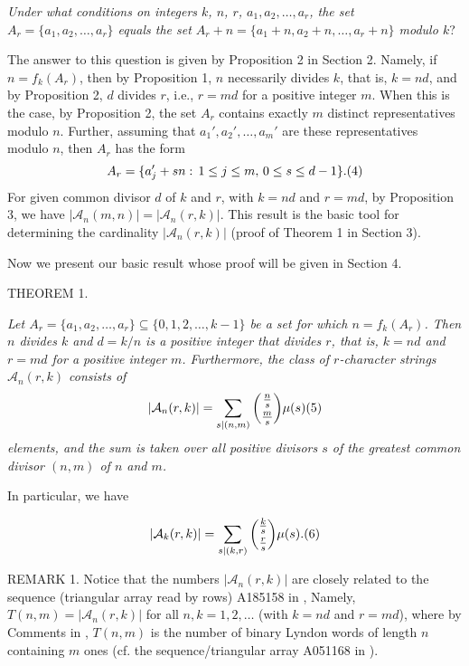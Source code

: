 \documentclass[12pt]{amsart}
\begin{document}
{ 
{\it Under what conditions on 
integers $k$, $n$, $r$,  $a_1,a_2,\ldots,a_r$, the  
set $A_r=\{a_1,a_2,\ldots,a_r\}$ equals the set 
$A_r+n=\{a_1+n,a_2+n,\ldots,a_r+n\}$ modulo $k$}?


 
The answer to this question is given by Proposition 2 in  Section 2.
Namely, if $n=f_k(A_r)$, then by Proposition 1,  $n$ necessarily  divides
$k$,  that is, $k=nd$, and by Proposition 2, $d$ divides $r$, i.e., 
$r=md$ for a positive 
integer $m$. When this is the case, by Proposition 2, the set $A_r$ 
  contains exactly $m$ distinct representatives modulo
$n$. Further,  assuming that $a_1',a_2',\ldots,a_m'$ are 
these  representatives modulo $n$, then $A_r$ has the form 
 $$
A_r=\{a_j'+sn :\, 1\le j\le m,\, 0\le s\le d-1\}.\relax(4)
 $$
\indent For given common divisor $d$ of $k$ and $r$, with $k=nd$ and $r=md$,
by Proposition 3, we have  $|{\mathcal A}_n(m,n)|=|{\mathcal A}_n(r,k)|$.
This result is the basic tool for determining the cardinality
$|{\mathcal A}_n(r,k)|$
(proof of Theorem 1 in Section 3). 
  

Now we present our basic  result whose proof will be given in Section 4.


\vspace{2mm}

T{\scriptsize HEOREM} 1.
 {\it Let $A_r=\{a_1,a_2,\ldots,a_r\}\subseteq 
\{0,1,2,\ldots,k-1\}$ be a set for which $n=f_k(A_r)$.
Then $n$ divides $k$ and $d=k/n$ is a positive integer that
 divides $r$, that is, $k=nd$ and 
$r=md$ for a positive integer $m$. Furthermore, the class of 
$r$-character strings ${\mathcal A}_n(r,k)$ consists of  
    $$
|{\mathcal A}_n(r,k)|=\sum_{s|(n,m)}{\frac{n}{s}\choose\frac{m}{s}}\mu(s)
\relax(5)
 $$
elements, and the sum is taken over all positive divisors $s$ of the greatest common divisor $(n,m)$ 
of $n$ and $m$.

In particular, we have}
$$
|{\mathcal A}_k(r,k)|=\sum_{s|(k,r)}{\frac{k}{s}\choose\frac{r}{s}}\mu(s).
\relax(6)
 $$
\vspace{2mm}

R{\scriptsize EMARK} 1. Notice that the numbers 
$|{\mathcal A}_n(r,k)|$ are closely related to the sequence 
(triangular array read by rows) A185158 in \cite{oe}, Namely, 
$T(n,m)=|{\mathcal A}_n(r,k)|$ for all $n,k=1,2,\ldots$ 
(with $k=nd$ and $r=md$), where by  Comments in \cite{oe}, $T(n,m)$  is 
the number of binary Lyndon words of length $n$ containing $m$ ones
(cf. the sequence/triangular array  A051168 in \cite{oe}).   


}
\end{document}
